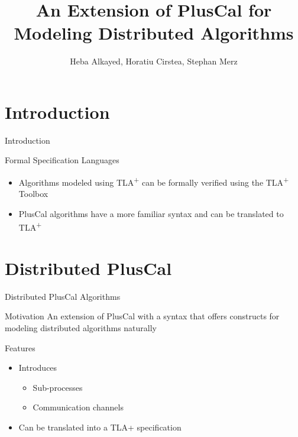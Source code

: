 \documentclass{beamer}
\title[Your Short Title]{An Extension of PlusCal for Modeling
Distributed Algorithms}
\institute{University of Lorraine, CNRS, Inria, Nancy, France}
\author[]{Heba Alkayed, Horatiu Cirstea, Stephan Merz}
\newcommand{\tlaplus}{TLA\textsuperscript{+}\xspace}
\begin{document}

\begin{frame}
  \titlepage
\end{frame}


\section{Introduction}

\begin{frame}{Introduction}

\begin{block}{Formal Specification Languages}
\begin{itemize}

  \item Algorithms modeled using \tlaplus can be formally verified using the \tlaplus Toolbox
 \item PlusCal algorithms have a more familiar syntax and can be translated to \tlaplus 
\end{itemize}
\end{block}
\vskip 1cm

\end{frame}

\section{Distributed PlusCal}

\begin{frame}[fragile]{Distributed PlusCal Algorithms}

\begin{block}{Motivation}
An extension of PlusCal with a syntax that offers constructs for modeling distributed algorithms naturally
\end{block}

\begin{block}{Features}
\begin{itemize}
  \item Introduces
  \begin{itemize} 
        \item Sub-processes
        \item Communication channels
    \end{itemize}
  \item Can be translated into a TLA+ specification
\end{itemize}
\end{block}
\end{frame}
\end{document}
